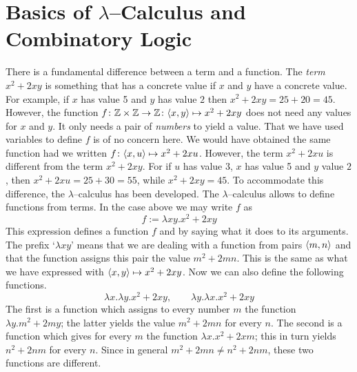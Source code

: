 \section{Basics of $\lambda$--Calculus and Combinatory Logic}
\label{kap3-7}
%
%
%
\nocite{hindley:combinatory}%
\nocite{barendregt:lambda}%
There is a fundamental difference between a term and a function.
The {\it term\/} $x^2 + 2xy$ is something that has a concrete
value if $x$ and $y$ have a concrete value. For example, if $x$
has value 5 and $y$ has value $2$ then $x^2 + 2xy = 25 + 20 = 45$.
However, the function $f \colon \mathbb{Z} \times \mathbb{Z} \rightarrow \mathbb{Z} \colon \langle x, y\rangle
\mapsto x^2 + 2xy$ does not need any values for $x$ and $y$. It
only needs a pair of {\it numbers\/} to yield a value. That we
have used variables to define $f$ is of no concern here. We would
have obtained the same function had we written $f \colon \langle x, u\rangle
\mapsto x^2 + 2xu$. However, the term $x^2 + 2xu$ is different
from the term $x^2 + 2xy$. For if $u$ has value 3, $x$ has
value 5 and $y$ value $2$, then $x^2 + 2xu = 25 + 30 = 55$, while
$x^2 + 2xy = 45$. To accommodate this difference, the
$\lambda$--calculus has been developed. The $\lambda$--calculus
allows to define functions from terms. In the case above we may
write $f$ as
\begin{equation}
f := \lambda xy.x^2 + 2xy
\end{equation}
This expression defines a function $f$ and by saying what it does to 
its arguments. The prefix `$\lambda xy$' means that we are dealing
with a function from pairs $\langle m, n\rangle$ and that the function
assigns this pair the value $m^2 + 2mn$. This is the same as
what we have expressed with $\langle x, y\rangle \mapsto x^2 + 2xy$. Now
we can also define the following functions.
\begin{equation}
\lambda x.\lambda y.x^2 + 2xy, \qquad \lambda y.\lambda x.
x^2 + 2xy
\end{equation}
The first is a function which assigns to every number $m$ the
function $\lambda y.m^2 + 2my$; the latter yields the value
$m^2 + 2mn$ for every $n$. The second is a function which gives
for every $m$ the function $\lambda x.x^2 + 2xm$; this in turn
yields $n^2 + 2nm$ for every $n$. Since in general $m^2 + 2mn \neq
n^2 + 2nm$, these two functions are different.

